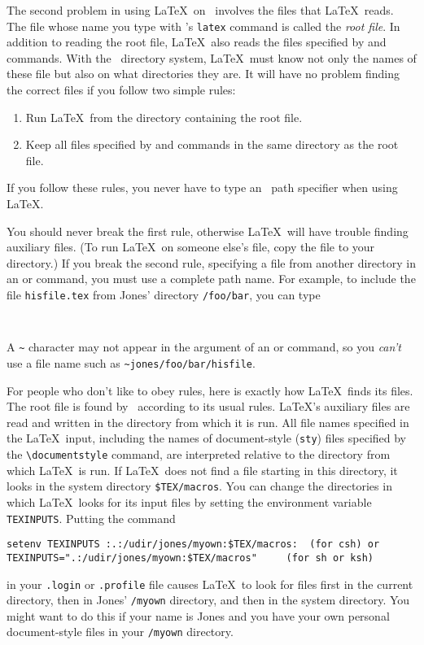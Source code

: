 The second problem in using \LaTeX\ on \UNIX\ involves the files that
\LaTeX\ reads.  The file whose name you type with \UNIX's {\tt latex}
command is called the {\em root file}.  In addition to reading the root
file, \LaTeX\ also reads the files specified by \hbox{\verb||}
and \hbox{\verb||} commands.  With the \UNIX\ directory system,
\LaTeX\ must know not only the names of these file but also on what
directories they are.  It will have no problem finding the correct
files if you follow two simple rules:
\begin{enumerate}
\item Run \LaTeX\ from the directory containing the root file.  
\item Keep all files specified by \hbox{\verb||} and
      \hbox{\verb||} commands in the same directory as the root
      file.  
\end{enumerate}

If you follow these rules, you never have to type an \UNIX\ path
specifier when using \LaTeX.

You should never break the first rule, otherwise \LaTeX\ will have
trouble finding auxiliary files.  (To run \LaTeX\ on someone else's
file, copy the file to your directory.) If you break the second
rule, specifying a file from another directory in an
\hbox{\verb||} or \hbox{\verb||} command, you must use a
complete path name.  For example, to include the file \mbox{\tt hisfile.tex} 
from Jones' directory \hbox{\verb|/foo/bar|}, you can type
\begin{verbatim}
     
\end{verbatim}
A \verb|~| character may not appear in the argument of an
\hbox{\verb||} or \hbox{\verb||} command, so you {\em
can't\/} use a file name such as \hbox{\verb|~jones/foo/bar/hisfile|}.

For people who don't like to obey rules, 
here is exactly how \LaTeX\ finds its
files.  The root file is found by \UNIX\ according to its usual rules.
\LaTeX's auxiliary files are read and written in the directory from
which it is run.  All file names specified in the \LaTeX\ input,
including the names of document-style ({\tt sty}) files specified by
the \hbox{\verb|\documentstyle|} command, are interpreted relative to
the directory from which \LaTeX\ is run.  If \LaTeX\ does not find a
file starting in this directory, it looks in the system directory
\hbox{\verb|$TEX/macros|}.  You can change the directories in
which \LaTeX\ looks for its input files by setting the environment
variable \mbox{\tt TEXINPUTS}.  Putting the command
\begin{verbatim}
setenv TEXINPUTS :.:/udir/jones/myown:$TEX/macros:	(for csh) or
TEXINPUTS=".:/udir/jones/myown:$TEX/macros"		(for sh or ksh)
\end{verbatim}
in your \mbox{\tt .login} or {\tt .profile} file causes \LaTeX\ to
look for files first 
in the current directory, then in Jones' {\tt /myown} directory, and
then in the system directory.  You might want to do this if your name
is Jones and you have your own personal document-style files in your
{\tt /myown} directory. 

